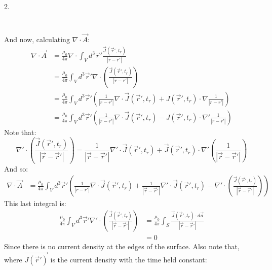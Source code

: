 \documentclass[a4paper,12pt]{article}
\begin{document}
2.
\begin{minipage}[t]{0.9\textwidth}
  $\phantom{\text{b)}}$
  \begin{minipage}[t]{\textwidth}
    And now, calculating $\nabla \cdot \vec{A}$:
    \begin{align*}
      \nabla \cdot\vec{A} &= \frac{\mu_0}{4\pi} \nabla \cdot \int_V d^3\vec{r} ' \frac{\vec{J}(\vec{r}', t_r)}{|r-r'|}\\
                     &= \frac{\mu_0}{4\pi} \int_V d^3\vec{r}' \nabla \cdot \left( \frac{\vec{J}(\vec{r}', t_r)}{|r-r'|} \right) \\
                     &= \frac{\mu_0}{4\pi} \int_V d^3\vec{r}' \left(\frac{1}{|r - r'|} \nabla \cdot \vec{J}(\vec{r}', t_r) + J(\vec{r}', t_r) \cdot \nabla \frac{1}{|r-r'|}\right)\\
                     &= \frac{\mu_0}{4\pi} \int_V d^3\vec{r}' \left(\frac{1}{|r - r'|} \nabla \cdot \vec{J}(\vec{r}', t_r) - J(\vec{r}', t_r) \cdot \nabla' \frac{1}{|r-r'|}\right)
    \end{align*}
    Note that:
    \begin{equation*}
      \nabla' \cdot \left(\frac{\vec{J}(\vec{r}', t_r)}{|\vec{r} - \vec{r}'|}  \right) = \frac{1}{|\vec{r} - \vec{r}'|}\nabla' \cdot \vec{J}(\vec{r}', t_r)  + \vec{J}(\vec{r}', t_r) \cdot \nabla' \left(\frac{1}{|\vec{r} - \vec{r}'|}  \right)
    \end{equation*}
    And so:
    \begin{align}
      \nabla \cdot\vec{A} &= \frac{\mu_0}{4\pi} \int_V d^3\vec{r}' \left(\frac{1}{|r - r'|} \nabla \cdot \vec{J}(\vec{r}', t_r) + \frac{1}{|\vec{r} - \vec{r}'|} \nabla' \cdot \vec{J}(\vec{r}', t_r) - \nabla' \cdot \left(\frac{\vec{J}(\vec{r}', t_r)}{|\vec{r} - \vec{r}'|}  \right)\right)
        \label{eq:divpot}
    \end{align}
    This last integral is:
    \begin{align*}
      \frac{\mu_0}{4\pi} \int_V d^3\vec{r}' \nabla' \cdot \left(\frac{\vec{J}(\vec{r}', t_r)}{|\vec{r} - \vec{r}'|}  \right) &= \frac{\mu_0}{4\pi} \int_S \frac{\vec{J}(\vec{r}', t_r) \cdot d\vec{a}}{|\vec{r} - \vec{r}'|} \\
                                                                                                                             &= 0
    \end{align*}
    Since there is no current density at the edges of the surface.
    Also note that, where $\vec{J(\vec{r}')}$ is the current density with the time held constant:
    \begin{equation*}

\end{equation*}
\end{minipage}
\end{minipage}
\end{document}
